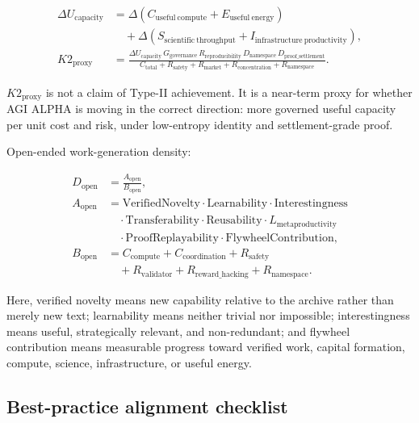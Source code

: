 \[
\begin{aligned}
\Delta U_{\mathrm{capacity}}
&=\Delta\!\left(C_{\mathrm{useful\ compute}}+E_{\mathrm{useful\ energy}}\right)\\
&\quad+\Delta\!\left(S_{\mathrm{scientific\ throughput}}
+I_{\mathrm{infrastructure\ productivity}}\right),\\[0.2em]
K2_{\mathrm{proxy}}
&=\frac{
\Delta U_{\mathrm{capacity}}\,
G_{\mathrm{governance}}\,
R_{\mathrm{reproducibility}}\,
D_{\mathrm{namespace}}\,
D_{\mathrm{proof\_settlement}}
}{
C_{\mathrm{total}}+R_{\mathrm{safety}}+R_{\mathrm{market}}
+R_{\mathrm{concentration}}+R_{\mathrm{namespace}}
}.
\end{aligned}
\]

\(K2_{\mathrm{proxy}}\) is not a claim of Type-II achievement. It is a
near-term proxy for whether AGI ALPHA is moving in the correct
direction: more governed useful capacity per unit cost and risk, under
low-entropy identity and settlement-grade proof.

Open-ended work-generation density:

\[
\begin{aligned}
D_{\mathrm{open}}&=\frac{A_{\mathrm{open}}}{B_{\mathrm{open}}},\\
A_{\mathrm{open}}&=\mathrm{VerifiedNovelty}\cdot\mathrm{Learnability}\cdot\mathrm{Interestingness}\\
&\quad\cdot\mathrm{Transferability}\cdot\mathrm{Reusability}\cdot L_{\mathrm{metaproductivity}}\\
&\quad\cdot\mathrm{ProofReplayability}\cdot\mathrm{FlywheelContribution},\\
B_{\mathrm{open}}&=C_{\mathrm{compute}}+C_{\mathrm{coordination}}+R_{\mathrm{safety}}\\
&\quad+R_{\mathrm{validator}}+R_{\mathrm{reward\_hacking}}+R_{\mathrm{namespace}}.
\end{aligned}
\]

Here, verified novelty means new capability relative to the archive
rather than merely new text; learnability means neither trivial nor
impossible; interestingness means useful, strategically relevant, and
non-redundant; and flywheel contribution means measurable progress
toward verified work, capital formation, compute, science,
infrastructure, or useful energy.

\subsection{Best-practice alignment
checklist}\label{best-practice-alignment-checklist}

